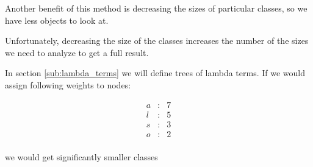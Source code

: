 \documentclass[final]{article}
\theoremstyle{definition}
\theoremstyle{remark}
\begin{document}
Another benefit of this method is decreasing the sizes of particular classes, so we have less objects to look at.

Unfortunately, decreasing the size of the classes increases the number of the sizes we need to analyze to get a full result.

In section \ref{sub:lambda_terms} we will define trees of lambda terms. If we would assign following weights to nodes:

\[\begin{array}{rcl}
        a &:& 7\\
        l &:& 5\\
        s &:& 3\\
        o &:& 2\\
\end{array}\]

we would get significantly smaller classes
\end{document}
